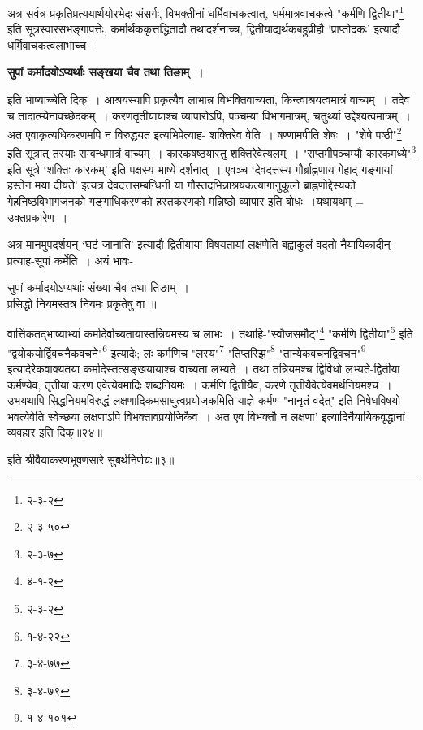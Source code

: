{{{{ अत्र सर्वत्र प्रकृतिप्रत्ययार्थयोरभेदः संसर्गः, विभक्तीनां धर्मिवाचकत्वात्, धर्ममात्रवाचकत्वे "कर्मणि द्वितीया"\footnote{२-३-२} इति सूत्रस्वारसभङ्गापत्तेः, कर्मार्थककृत्तद्धितादौ तथादर्शनाच्च, द्वितीयाद्यर्थकबहुव्रीहौ `प्राप्तोदकः' इत्यादौ धर्मिवाचकत्वलाभाच्च~।
\begin{center}{\bfseries सुपां कर्मादयोऽप्यर्थाः सङ्खया चैव तथा तिङाम्~।}\end{center}
इति भाष्याच्चेति दिक्~।
 आश्रयस्यापि प्रकृत्यैव लाभान्न विभक्तिवाच्यता, किन्त्वाश्रयत्वमात्रं वाच्यम्~।
तदेव च तादात्म्येनावच्छेदकम्~।
करणतृतीयायाश्च व्यापारोऽपि, पञ्चम्या विभागमात्रम्, चतुर्थ्या उद्देश्यत्वमात्रम्~।
 अत एवाकृत्यधिकरणमपि न विरुद्धयत इत्यभिप्रेत्याह- शक्तिरेव वेति~।
षण्णामपीति शेषः~।
"शेषे पष्ठी"\footnote{२-३-५०} इति सूत्रात् तस्याः सम्बन्धमात्रं वाच्यम्~।
कारकषष्ठयास्तु शक्तिरेवेत्यलम्~।
 "सप्तमीपञ्चम्यौ कारकमध्ये"\footnote{२-३-७} इति सूत्रे `शक्तिः कारकम्' इति पक्षस्य भाष्ये दर्शनात्~।
एवञ्च `देवदत्तस्य गौर्ब्राह्नणाय गेहाद् गङ्गायां हस्तेन मया दीयते' इत्यत्र देवदत्तसम्बन्धिनी या गौस्तदभिन्नाश्रयकत्यागानुकूलो ब्राह्नणोद्देस्यको गेहनिष्ठविभागजनको गङ्गाधिकरणको हस्तकरणको मन्निष्ठो व्यापार इति बोधः~।यथायथम् = उक्तप्रकारेण~।

 अत्र मानमुपदर्शयन् `घटं जानाति' इत्यादौ द्वितीयाया विषयतायां लक्षणेति बह्वाकुलं वदतो नैयायिकादीन् प्रत्याह-सूपां कर्मेति~।
अयं भावः-
\begin{center} सुपां कर्मादयोऽप्यर्थाः संख्या चैव तथा तिङाम्~।\\
 प्रसिद्धो नियमस्तत्र नियमः प्रकृतेषु वा ॥
\end{center} वार्त्तिकतद्भाष्याभ्यां कर्मादेर्वाच्यतायास्तन्नियमस्य च लाभः~।
 तथाहि-"स्वौजसमौट्"\footnote{४-१-२} "कर्मणि द्वितीया"\footnote{२-३-२} इति "द्वयोकयोर्द्विवचनैकवचने"\footnote{१-४-२२} इत्यादेः; {लः कर्मणिच} "लस्य"\footnote{३-४-७७} "तिप्तस्झि"\footnote{३-४-७९} "तान्येकवचनद्विवचन"\footnote{१-४-१०१} इत्यादेरेकवाक्यतया कर्मादेस्तत्सङ्खयायाश्च वाच्यता लभ्यते~।
तथा तन्नियमश्च द्विविधो लभ्यते-द्वितीया कर्मण्येव, तृतीया करण एवेत्येवमादिः शब्दनियमः~।
कर्मणि द्वितीयैव, करणे तृतीयैवेत्येवमर्थनियमश्च~।
उभयथापि सिद्धनियमविरुद्धं लक्षणादिकमसाधुत्वप्रयोजकमिति याज्ञे कर्मण "नानृतं वदेत्" इति निषेधविषयो भवत्येवेति स्वेच्छया लक्षणाऽपि विभक्तावप्रयोजिकैव~।
अत एव विभक्तौ न लक्षणा' इत्यादिर्नैयायिकवृद्धानां व्यवहार इति दिक्॥२४॥
\begin{center} इति श्रीवैयाकरणभूषणसारे सुबर्थनिर्णयः॥३॥\end{center}

}}}}
